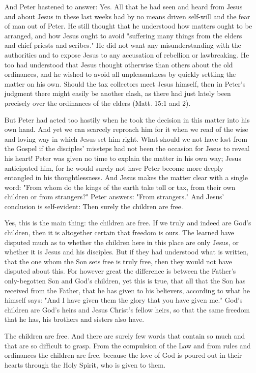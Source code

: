 And Peter hastened to answer: Yes. All that he had seen and heard from Jesus and about Jesus in these last weeks had by no means driven self-will and the fear of man out of Peter. He still thought that he understood how matters ought to be arranged, and how Jesus ought to avoid "suffering many things from the elders and chief priests and scribes." He did not want any misunderstanding with the authorities and to expose Jesus to any accusation of rebellion or lawbreaking. He too had understood that Jesus thought otherwise than others about the old ordinances, and he wished to avoid all unpleasantness by quickly settling the matter on his own. Should the tax collectors meet Jesus himself, then in Peter’s judgment there might easily be another clash, as there had just lately been precisely over the ordinances of the elders (Matt. 15:1 and 2).

But Peter had acted too hastily when he took the decision in this matter into his own hand. And yet we can scarcely reproach him for it when we read of the wise and loving way in which Jesus set him right. What should we not have lost from the Gospel if the disciples’ missteps had not been the occasion for Jesus to reveal his heart! Peter was given no time to explain the matter in his own way; Jesus anticipated him, for he would surely not have Peter become more deeply entangled in his thoughtlessness. And Jesus makes the matter clear with a single word: "From whom do the kings of the earth take toll or tax, from their own children or from strangers?" Peter answers: "From strangers." And Jesus’ conclusion is self-evident: Then surely the children are free.

Yes, this is the main thing: the children are free. If we truly and indeed are God’s children, then it is altogether certain that freedom is ours. The learned have disputed much as to whether the children here in this place are only Jesus, or whether it is Jesus and his disciples. But if they had understood what is written, that the one whom the Son sets free is truly free, then they would not have disputed about this. For however great the difference is between the Father’s only-begotten Son and God’s children, yet this is true, that all that the Son has received from the Father, that he has given to his believers, according to what he himself says: "And I have given them the glory that you have given me." God’s children are God’s heirs and Jesus Christ’s fellow heirs, so that the same freedom that he has, his brothers and sisters also have.

The children are free. And there are surely few words that contain so much and that are so difficult to grasp. From the compulsion of the Law and from rules and ordinances the children are free, because the love of God is poured out in their hearts through the Holy Spirit, who is given to them.

